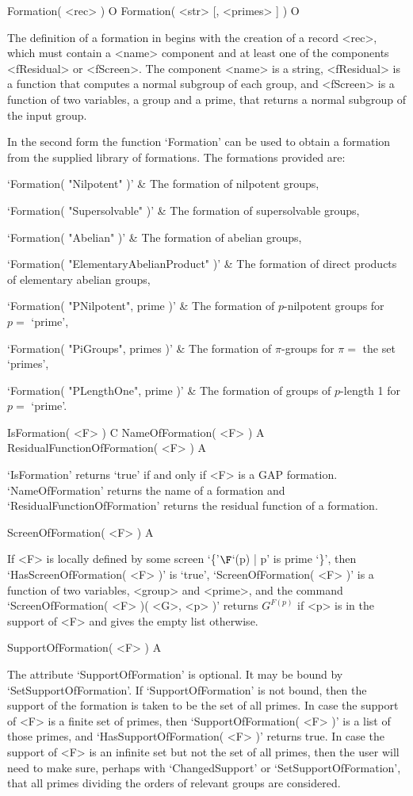 \> Formation( <rec> ) O
\> Formation( <str> [, <primes> ] ) O

The definition of a formation in {\FORMAT} begins with the creation of a
record <rec>, which must contain a <name> component and at least one of
the components <fResidual> or <fScreen>. The component <name> is a string, 
<fResidual> is a function that computes a normal subgroup of each group,
and <fScreen> is a function of two variables, a group and a prime, that
returns a normal subgroup of the input group.

In the second form the function `Formation' can be used to obtain a
formation from the supplied library of formations. The formations
provided are:

\beginitems
`Formation( "Nilpotent" )' & The formation of nilpotent groups,  

`Formation( "Supersolvable" )' & The formation of supersolvable groups,
 

`Formation( "Abelian" )' & The formation of abelian groups,
 

`Formation( "ElementaryAbelianProduct" )' & The formation of direct products of elementary abelian groups,
 

`Formation( "PNilpotent", prime )' & The formation of $p$-nilpotent groups 
for $p =$ `prime',


`Formation( "PiGroups", primes )' & The formation of $\pi$-groups for 
$\pi =$ the set `primes',


`Formation( "PLengthOne", prime )' & The formation of groups of $p$-length 1 
for $p =$ `prime'.
\enditems

\> IsFormation( <F> ) C
\> NameOfFormation( <F> ) A
\> ResidualFunctionOfFormation( <F> ) A

`IsFormation' returns `true' if and only if <F> is a GAP formation. 
`NameOfFormation' returns the name of a formation and `ResidualFunctionOfFormation'
returns the  residual function of a formation. 

\> ScreenOfFormation( <F> ) A

If <F> is locally defined by some screen `\{'$\F$`(p) | p' is prime `\}', 
then `HasScreenOfFormation( <F> )' is `true', `ScreenOfFormation( <F> )' is a function of two variables, <group> and <prime>, and 
the command `ScreenOfFormation( <F> )(  <G>, <p> )' returns $G^{F(p)}$ if <p> is
in the support of <F> and  gives the empty list otherwise. 

\> SupportOfFormation( <F> ) A

The attribute `SupportOfFormation' is optional. It may be bound by
`SetSupportOfFormation'. If `SupportOfFormation' is not bound, then the support
of the formation is taken to be the set of all primes. In case the support of
<F> is a finite set of primes, then `SupportOfFormation( <F> )' is a list of
those primes, and `HasSupportOfFormation( <F> )' returns true. In case the
support of <F> is an infinite set but not the set of all primes, then the user
will need to make sure, perhaps with `ChangedSupport' or
`SetSupportOfFormation', that all primes dividing the orders of relevant groups
are considered.

